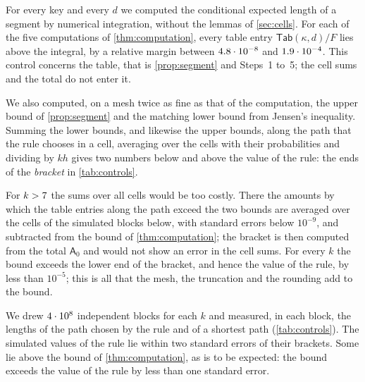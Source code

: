  For every key and every $d$ we computed the conditional expected length of a segment by numerical integration, without the lemmas of \cref{sec:cells}. For each of the five computations of \cref{thm:computation}, every table entry $\mathsf{Tab}(\kappa,d)/F$ lies above the integral, by a relative margin between $4.8\cdot10^{-8}$ and $1.9\cdot10^{-4}$. This control concerns the table, that is \cref{prop:segment} and Steps~1 to~5; the cell sums and the total do not enter it.

 We also computed, on a mesh twice as fine as that of the computation, the upper bound of \cref{prop:segment} and the matching lower bound from Jensen's inequality. Summing the lower bounds, and likewise the upper bounds, along the path that the rule chooses in a cell, averaging over the cells with their probabilities and dividing by $kh$ gives two numbers below and above the value of the rule: the ends of the \emph{bracket} in \cref{tab:controls}.

For $k>\BracketFullK$ the sums over all cells would be too costly. There the amounts by which the table entries along the path exceed the two bounds are averaged over the cells of the simulated blocks below, with standard errors below $10^{-9}$, and subtracted from the bound of \cref{thm:computation}; the bracket is then computed from the total $\mathsf{A}_0$ and would not show an error in the cell sums. For every $k$ the bound exceeds the lower end of the bracket, and hence the value of the rule, by less than $10^{-5}$; this is all that the mesh, the truncation and the rounding add to the bound.

\begin{table}[ht]
\centering
\caption{Controls for the computations of \cref{thm:computation}. The bound is rounded up. The bracket for the value of the rule is computed in floating-point arithmetic, without a bound for its rounding errors; its lower end is rounded down and its upper end up; for $k>\BracketFullK$ it also has a sampling error, below $10^{-9}$. The last two columns are estimates from $\SimBlocks$ simulated blocks for each $k$, with standard errors. The samples for the different $k$ were drawn with one seed, so they are not independent of each other.}
\label{tab:controls}

\end{table}

 We drew $\SimBlocks$ independent blocks for each $k$ and measured, in each block, the lengths of the path chosen by the rule and of a shortest path (\cref{tab:controls}). The simulated values of the rule lie within two standard errors of their brackets. Some lie above the bound of \cref{thm:computation}, as is to be expected: the bound exceeds the value of the rule by less than one standard error.

